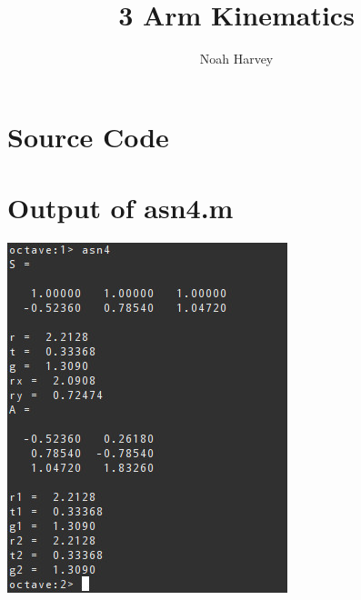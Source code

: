 \documentclass{article}
\begin{document}
\title{3 Arm Kinematics}
\author{Noah Harvey}
\maketitle
\section*{Source Code}




\section*{Output of asn4.m}
\includegraphics{asn4out.jpg}
\end{document}
